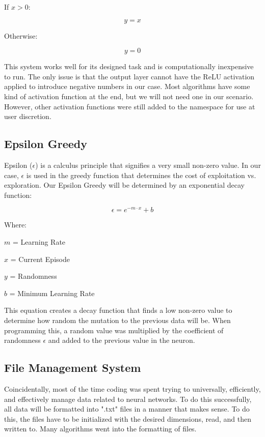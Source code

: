 If \(x > 0\):

\[
y = x
\]

Otherwise:

\[
y = 0
\]

This system works well for its designed task and is computationally inexpensive to run. The only issue is that the output layer cannot have the ReLU activation applied to introduce negative numbers in our case. Most algorithms have some kind of activation function at the end, but we will not need one in our scenario. However, other activation functions were still added to the namespace for use at user discretion.

\subsection*{Epsilon Greedy}

Epsilon (\(\epsilon\)) is a calculus principle that signifies a very small non-zero value. In our case, \(\epsilon\) is used in the greedy function that determines the cost of exploitation vs. exploration. Our Epsilon Greedy will be determined by an exponential decay function:

\[
\epsilon = e^{-m \cdot x} + b
\]

Where:

\(m\) = Learning Rate

\(x\) = Current Episode

\(y\) = Randomness

\(b\) = Minimum Learning Rate

This equation creates a decay function that finds a low non-zero value to determine how random the mutation to the previous data will be. When programming this, a random value was multiplied by the coefficient of randomness \(\epsilon\) and added to the previous value in the neuron.

\subsection*{File Management System}

Coincidentally, most of the time coding was spent trying to universally, efficiently, and effectively manage data related to neural networks. To do this successfully, all data will be formatted into ".txt" files in a manner that makes sense. To do this, the files have to be initialized with the desired dimensions, read, and then written to. Many algorithms went into the formatting of files.

